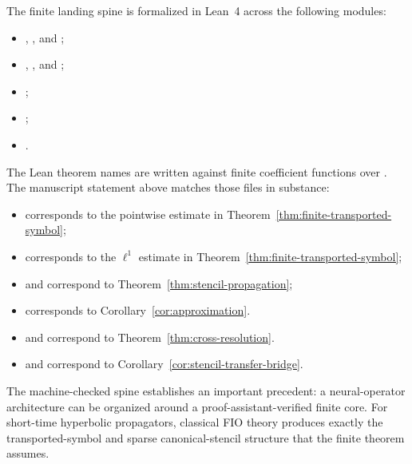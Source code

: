The finite landing spine is formalized in Lean~4 across the following modules:
\begin{itemize}
\item {}, , and ;
\item {}, , and ;
\item {};
\item {};
\item {}.
\end{itemize}
The Lean theorem names are written against finite coefficient functions over . The manuscript statement above matches those files in substance:
\begin{itemize}
\item {} corresponds to the pointwise estimate in Theorem~\ref{thm:finite-transported-symbol};
\item {} corresponds to the $\ell^1$ estimate in Theorem~\ref{thm:finite-transported-symbol};
\item {} and  correspond to Theorem~\ref{thm:stencil-propagation};
\item {} corresponds to Corollary~\ref{cor:approximation}.
\item {} and  correspond to Theorem~\ref{thm:cross-resolution}.
\item {} and  correspond to Corollary~\ref{cor:stencil-transfer-bridge}.
\end{itemize}
The machine-checked spine establishes an important precedent: a neural-operator architecture can be organized around a proof-assistant-verified finite core. For short-time hyperbolic propagators, classical FIO theory produces exactly the transported-symbol and sparse canonical-stencil structure that the finite theorem assumes.
